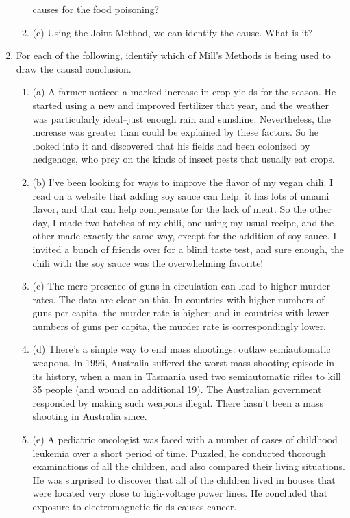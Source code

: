 \begin{enumerate}
\begin{enumerate}
causes for the food poisoning?
\item (c) Using the Joint Method, we can identify the cause. What is it?
\end{enumerate}
\item For each of the following, identify which of Mill's Methods is being used to draw the causal
conclusion.
\begin{enumerate}
\item (a) A farmer noticed a marked increase in crop yields for the season. He started using a
new and improved fertilizer that year, and the weather was particularly ideal--just enough
rain and sunshine. Nevertheless, the increase was greater than could be explained by these
factors. So he looked into it and discovered that his fields had been colonized by
hedgehogs, who prey on the kinds of insect pests that usually eat crops.
\item (b) I've been looking for ways to improve the flavor of my vegan chili. I read on a website
that adding soy sauce can help: it has lots of umami flavor, and that can help compensate
for the lack of meat. So the other day, I made two batches of my chili, one using my usual
recipe, and the other made exactly the same way, except for the addition of soy sauce. I
invited a bunch of friends over for a blind taste test, and sure enough, the chili with the soy
sauce was the overwhelming favorite!
\item (c) The mere presence of guns in circulation can lead to higher murder rates. The data are
clear on this. In countries with higher numbers of guns per capita, the murder rate is higher;
and in countries with lower numbers of guns per capita, the murder rate is correspondingly
lower.
\item (d) There's a simple way to end mass shootings: outlaw semiautomatic weapons. In 1996,
Australia suffered the worst mass shooting episode in its history, when a man in Tasmania
used two semiautomatic rifles to kill 35 people (and wound an additional 19). The
Australian government responded by making such weapons illegal. There hasn't been a
mass shooting in Australia since.
\item (e) A pediatric oncologist was faced with a number of cases of childhood leukemia over a
short period of time. Puzzled, he conducted thorough examinations of all the children, and
also compared their living situations. He was surprised to discover that all of the children
lived in houses that were located very close to high-voltage power lines. He concluded that
exposure to electromagnetic fields causes cancer.

\end{enumerate}
\end{enumerate}
